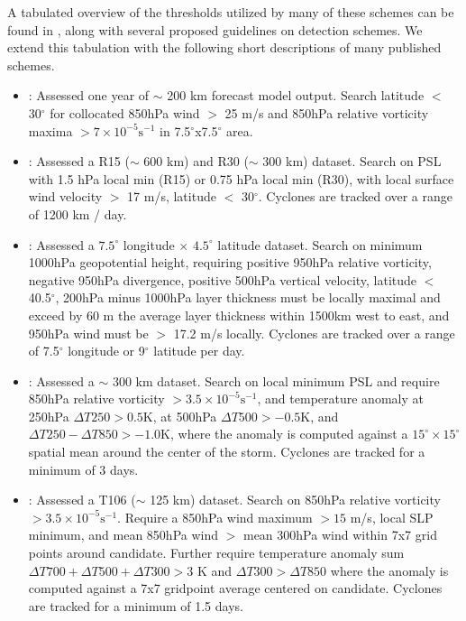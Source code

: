 \documentclass[gmdd, hvmath]{copernicus}
\begin{document}
A tabulated overview of the thresholds utilized by many of these schemes can be found in \cite{walsh2007objectively}, along with several proposed guidelines on detection schemes.  We extend this tabulation with the following short descriptions of many published schemes.

\begin{itemize}

\item \cite{bengtsson1982vortices}: Assessed one year of $\sim$ 200 km forecast model output. Search latitude $<$ 30$^\circ$ for collocated 850hPa wind $>$ 25 m/s and 850hPa relative vorticity maxima $> 7 \times 10^{-5} \mbox{s}^{-1}$ in 7.5$^\circ$x7.5$^\circ$ area.

\item \cite{broccoli1990existing}: Assessed a R15 ($\sim$ 600 km) and R30 ($\sim$ 300 km) dataset.  Search on PSL with 1.5 hPa local min (R15) or 0.75 hPa local min (R30), with local surface wind velocity $>$ 17 m/s, latitude $<$ 30$^\circ$.  Cyclones are tracked over a range of 1200 km / day.

\item \cite{wu1992gcm}: Assessed a $7.5^\circ$ longitude $\times$ $4.5^\circ$ latitude dataset.  Search on minimum 1000hPa geopotential height, requiring positive 950hPa relative vorticity, negative 950hPa divergence, positive 500hPa vertical velocity, latitude $<$ 40.5$^\circ$, 200hPa minus 1000hPa layer thickness must be locally maximal and exceed by 60 m the average layer thickness within 1500km west to east, and 950hPa wind must be $>$ 17.2 m/s locally.  Cyclones are tracked over a range of 7.5$^\circ$ longitude or 9$^\circ$ latitude per day.

\item \cite{haarsma1993tropical}: Assessed a $\sim$ 300 km dataset.  Search on local minimum PSL and require 850hPa relative vorticity $> 3.5 \times 10^{-5} \mbox{s}^{-1}$, and temperature anomaly at 250hPa $\Delta T250 > 0.5 \mbox{K}$, at 500hPa $\Delta T500 > -0.5 \mbox{K}$, and $\Delta T250 - \Delta T850 > -1.0 \mbox{K}$, where the anomaly is computed against a $15^\circ \times 15^\circ$ spatial mean around the center of the storm.  Cyclones are tracked for a minimum of 3 days.

\item \cite{bengtsson1995hurricane, bengtsson1996will}:  Assessed a T106 ($\sim$ 125 km) dataset.  Search on 850hPa relative vorticity $> 3.5 \times 10^{-5} \mbox{s}^{-1}$.  Require a 850hPa wind maximum $> 15$ m/s, local SLP minimum, and mean 850hPa wind $>$ mean 300hPa wind within 7x7 grid points around candidate.  Further require temperature anomaly sum $\Delta T700+ \Delta T500+ \Delta T300 > 3$ K and $\Delta T300 > \Delta T850$ where the anomaly is computed against a 7x7 gridpoint average centered on candidate.  Cyclones are tracked for a minimum of 1.5 days.


\end{itemize}
\end{document}
